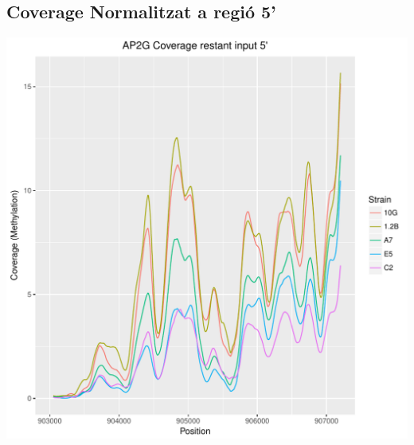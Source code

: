 \documentclass{article}\usepackage[]{graphicx}\usepackage[]{color}
\newenvironment{knitrout}{}{} %
\begin{document}
\subsection{Coverage Normalitzat a regió 5'}
\begin{knitrout}
\color{fgcolor}
\includegraphics[width=1\linewidth]{figure/plot_norm_cov_5-1} 

\end{knitrout}
\clearpage
\end{document}
